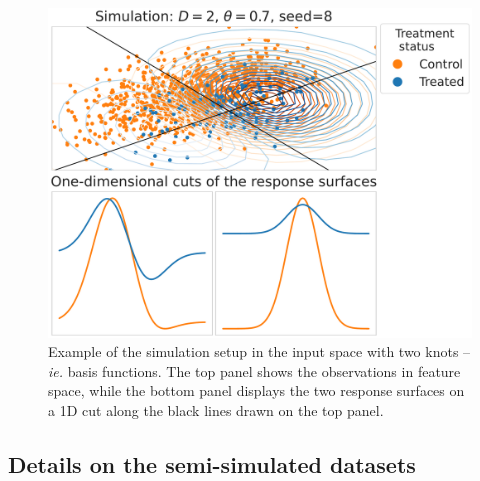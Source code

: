 \documentclass[10pt,twocolumn]{article}
\begin{document}
\begin{figure}[!t]
    \centering
    \includegraphics[width=\linewidth]{images/caussim_example_rs_gaussian=8_rs_rotation=8_ntv=0.37_D=2_overlap=0.7_p_A=0.1.pdf}

    \caption{Example of the simulation setup in the input space with two
        knots --\emph{ie.} basis functions. The top panel
        shows the observations in feature space, while the bottom panel displays the
        two response surfaces on a 1D cut along the black lines drawn on
        the top panel.}
    \label{fig:simulation_examples}
\end{figure}


\subsection{ Details on the semi-simulated datasets}\label{apd:experiments:datasets}
\end{document}
